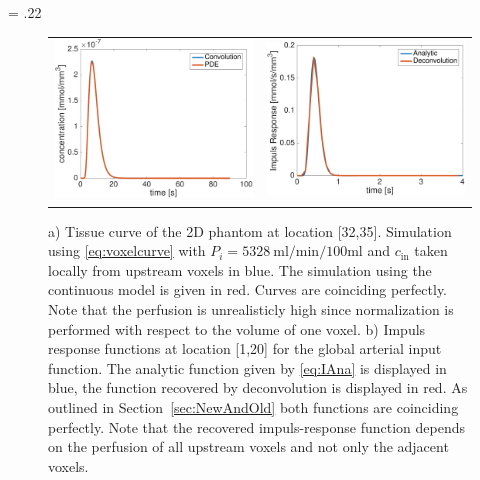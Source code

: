 \documentclass[journal,twocolumn]{IEEEtran}
\newcommand{\siPml}{\milli\litre\per\minute\per100\milli\litre}
\newlength{\fwd}
\begin{document}
	\fwd = .22\textwidth
	\begin{figure}
		\begin{tabular}{p{\fwd} p{\fwd}}
			\includegraphics[width=\fwd]{./figs/ConvVsPDE.pdf} & \includegraphics[width=\fwd]{./figs/IDecVsIAna.pdf} \\
		\end{tabular}
		\caption{a) Tissue curve of the 2D phantom at location [32,35]. Simulation using \eqref{eq:voxelcurve} with $P_i=\SI{5328}{\siPml}$ and $c_{\mathrm{in}}$ taken locally from upstream voxels in blue. The simulation using the continuous model is given in red. Curves are coinciding perfectly. Note that the perfusion is unrealisticly high since normalization is performed with respect to the volume of one voxel. b) Impuls response functions at location [1,20] for the global arterial input function. The analytic function given by \eqref{eq:IAna} is displayed in blue, the function recovered by deconvolution is displayed in red. As outlined in Section~\ref{sec:NewAndOld} both functions are coinciding perfectly. Note that the recovered impuls-response function depends on the perfusion of all upstream voxels and not only the adjacent voxels.}\label{fig:VoxelComp}
	\end{figure}
	
\end{document}
